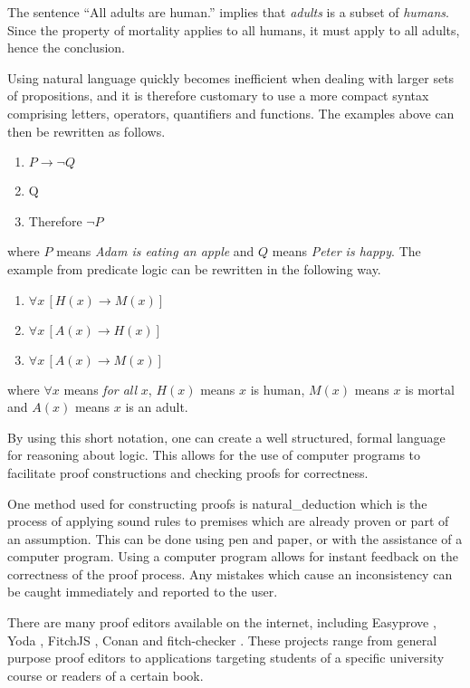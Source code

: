 The sentence ``All adults are human.'' implies that \textit{adults} is a subset of \textit{humans}. Since the property of mortality applies to all humans, it must apply to all adults, hence the conclusion.

Using natural language quickly becomes inefficient when dealing with larger sets of propositions, and it is therefore customary to use a more compact syntax comprising letters, operators, quantifiers and functions. The examples above can then be rewritten as follows.

\begin{enumerate}
      \item $P \rightarrow \lnot Q$
      \item Q
      \item Therefore $\lnot P$
\end{enumerate}

where $P$ means \textit{Adam is eating an apple} and $Q$ means \textit{Peter is happy}. The example from predicate logic can be rewritten in the following way.

\begin{enumerate}[resume]
      \item $\forall x \, [H(x) \rightarrow M(x)]$
      \item $\forall x \, [A(x) \rightarrow H(x)]$
      \item $\forall x \, [A(x) \rightarrow M(x)]$
\end{enumerate}

where $\forall x$ means \textit{for all} $x$, $H(x)$ means $x$ is human, $M(x)$ means $x$ is mortal and $A(x)$ means $x$ is an adult.

By using this short notation, one can create a well structured, formal language for reasoning about logic. This allows for the use of computer programs to facilitate proof constructions and checking proofs for correctness.

One method used for constructing proofs is \gls{natural_deduction} which is the process of applying sound rules to premises which are already proven or part of an assumption. \cite{huth_ryan_2018} This can be done using pen and paper, or with the assistance of a computer program. Using a computer program allows for instant feedback on the correctness of the proof process. Any mistakes which cause an inconsistency can be caught immediately and reported to the user.

There are many proof editors available on the internet, including Easyprove \cite{easyprove}, Yoda \cite{Yoda}, FitchJS \cite{rieppel}, Conan \cite{conan} and fitch-checker \cite{klement}. These projects range from general purpose proof editors to applications targeting students of a specific university course or readers of a certain book.